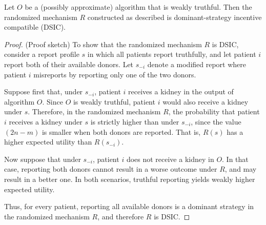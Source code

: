 \begin{lemma}
Let $O$ be a (possibly approximate) algorithm that is weakly truthful. Then the randomized mechanism $R$ constructed as described is dominant-strategy incentive compatible (DSIC).
\end{lemma}

\begin{proof}
(Proof sketch) To show that the randomized mechanism $R$ is DSIC, consider a report profile $s$ in which all patients report truthfully, and let patient $i$ report both of their available donors. Let $s_{-i}$ denote a modified report where patient $i$ misreports by reporting only one of the two donors.

Suppose first that, under $s_{-i}$, patient $i$ receives a kidney in the output of algorithm $O$. Since $O$ is weakly truthful, patient $i$ would also receive a kidney under $s$. Therefore, in the randomized mechanism $R$, the probability that patient $i$ receives a kidney under $s$ is strictly higher than under $s_{-i}$, since the value $(2n - m)$ is smaller when both donors are reported. That is, $R(s)$ has a higher expected utility than $R(s_{-i})$.

Now suppose that under $s_{-i}$, patient $i$ does not receive a kidney in $O$. In that case, reporting both donors cannot result in a worse outcome under $R$, and may result in a better one. In both scenarios, truthful reporting yields weakly higher expected utility.

Thus, for every patient, reporting all available donors is a dominant strategy in the randomized mechanism $R$, and therefore $R$ is DSIC.
\end{proof}

